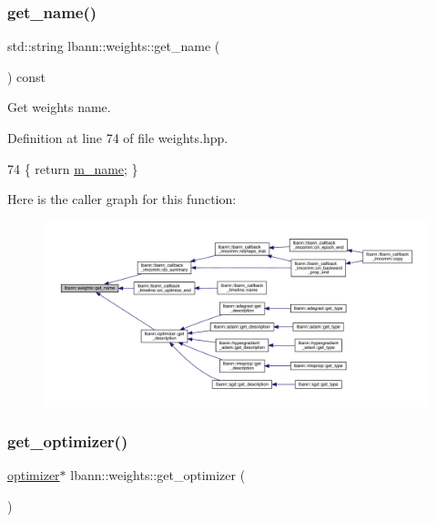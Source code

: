 \subsubsection{\texorpdfstring{get\+\_\+name()}{get\_name()}}
{\footnotesize\ttfamily std\+::string lbann\+::weights\+::get\+\_\+name (\begin{DoxyParamCaption}{ }\end{DoxyParamCaption}) const\hspace{0.3cm}{\ttfamily [inline]}}

Get weights name. 

Definition at line 74 of file weights.\+hpp.


\begin{DoxyCode}
74 \{ \textcolor{keywordflow}{return} \hyperlink{classlbann_1_1weights_a08abf0bb29aa47be21bfc7473b4b9b99}{m\_name}; \}
\end{DoxyCode}
Here is the caller graph for this function\+:\nopagebreak
\begin{figure}[H]
\begin{center}
\leavevmode
\includegraphics[width=350pt]{classlbann_1_1weights_a272f80766f31a5add7a970e5e8fcc352_icgraph}
\end{center}
\end{figure}
\mbox{\label{classlbann_1_1weights_accdbbd16ada5b5b12890431b92c2e706}} 
\subsubsection{\texorpdfstring{get\+\_\+optimizer()}{get\_optimizer()}\hspace{0.1cm}{\footnotesize\ttfamily [1/2]}}
{\footnotesize\ttfamily \hyperlink{classlbann_1_1optimizer}{optimizer}$\ast$ lbann\+::weights\+::get\+\_\+optimizer (\begin{DoxyParamCaption}{ }\end{DoxyParamCaption})\hspace{0.3cm}{\ttfamily [inline]}}

